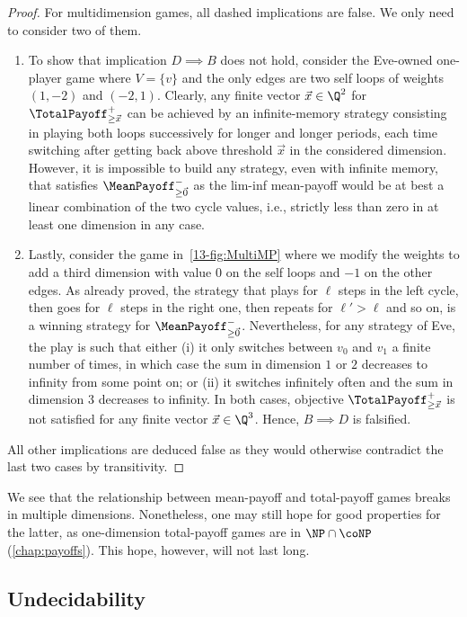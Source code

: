 \begin{proof}
For multidimension games, all dashed implications are false. We only need to consider two of them.
\begin{enumerate}
\item\label{13-lem:MPTP_proof1} To show that implication $D \implies B$ does not hold, consider the Eve-owned one-player game where $V = \{v\}$ and the only edges are two self loops of weights $(1, -2)$ and $(-2, 1)$. Clearly, any finite vector $\vec{x} \in \Q^{2}$ for $\TotalPayoff^{+}_{\geq \vec{x}}$ can be achieved by an infinite-memory strategy consisting in playing both loops successively for longer and longer periods, each time switching after getting back above threshold $\vec{x}$ in the considered dimension. However, it is impossible to build any strategy, even with infinite memory, that satisfies $\MeanPayoff^{-}_{\geq \vec{0}}$ as the lim-inf mean-payoff would be at best a linear combination of the two cycle values, i.e., strictly less than zero in at least one dimension in any case.
\item Lastly, consider the game in~\cref{13-fig:MultiMP} where we modify the weights to add a third dimension with value $0$ on the self loops and $-1$ on the other edges. As already proved, the strategy that plays for $\ell$ steps in the left cycle, then goes for $\ell$ steps in the right one, then repeats for $\ell' > \ell$ and so on, is a winning strategy for $\MeanPayoff^{-}_{\geq \vec{0}}$. Nevertheless, for any strategy of Eve, the play is such that either (i) it only switches between $v_0$ and $v_1$ a finite number of times, in which case the sum in dimension $1$ or $2$ decreases to infinity from some point on; or (ii) it switches infinitely often and the sum in dimension $3$ decreases to infinity. In both cases, objective $\TotalPayoff^{+}_{\geq \vec{x}}$ is not satisfied for any finite vector $\vec{x} \in  \Q^{3}$. Hence, $B \implies D$ is falsified.
\end{enumerate}
All other implications are deduced false as they would otherwise contradict the last two cases by transitivity.
\end{proof}

We see that the relationship between mean-payoff and total-payoff games breaks in multiple dimensions. Nonetheless, one may still hope for good properties for the latter, as one-dimension total-payoff games are in $\NP \cap \coNP$ (\cref{chap:payoffs}).  This hope, however, will not last long.

\subsection{Undecidability}

